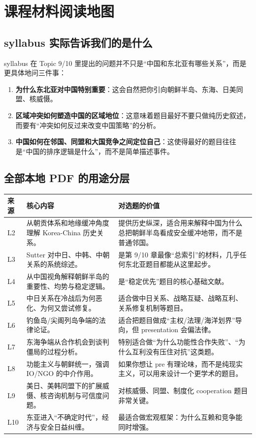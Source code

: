 \documentclass[a4paper]{article}
\begin{document}
\section{课程材料阅读地图}

\subsection{syllabus 实际告诉我们的是什么}

syllabus 在 Topic 9/10 里提出的问题并不只是``中国和东北亚有哪些关系''，而是更具体地问三件事：

\begin{enumerate}
\item \textbf{为什么东北亚对中国特别重要}：这会自然把你引向朝鲜半岛、东海、日美同盟、核威慑。
\item \textbf{区域冲突如何塑造中国的区域地位}：这意味着题目最好不要只做纯历史叙述，而要有``冲突如何反过来改变中国策略''的分析。
\item \textbf{中国如何在邻国、同盟和大国竞争之间定位自己}：这使得最好的题目往往是``中国的排序逻辑是什么''，而不是简单描述事件。
\end{enumerate}

\subsection{全部本地 PDF 的用途分层}

\begin{longtable}{p{2.0cm}p{4.6cm}p{7.0cm}}
\toprule
\textbf{来源} & \textbf{核心内容} & \textbf{对选题的价值} \\
\midrule
\endhead
L2 & 从朝贡体系和地缘缓冲角度理解 Korea-China 历史关系。 & 提供历史纵深，适合用来解释中国为什么总把朝鲜半岛看成安全缓冲地带，而不是普通邻国。 \\
L3 & Sutter 对中日、中韩、中朝关系的系统综述。 & 是第 9/10 章最像``总索引''的材料，几乎任何东北亚题目都能从这里起步。 \\
L4 & 从中国视角解释朝鲜半岛的重要性、均势与稳定逻辑。 & 是``稳定优先''题目的核心基础文献。 \\
L5 & 中日关系在冷战后为何恶化、为何又尝试修复。 & 适合做中日关系、战略互疑、战略互利、关系修复机制等题目。 \\
L6 & 钓鱼岛/尖阁列岛争端的法律论证。 & 适合把题目做成``主权/法理/海洋划界''导向，但 presentation 会偏法律。 \\
L7 & 东海争端从合作机会到谈判僵局的过程分析。 & 特别适合做``为什么功能性合作失败''、``为什么互利没有压住对抗''这类题。 \\
L8 & 功能主义与朝鲜统一，强调 IO/NGO 的中介作用。 & 如果你想让 pre 有理论味，而不是纯现实主义，可以用来设计一个更学术的题目。 \\
L9 & 美日、美韩同盟下的扩展威慑、核咨询机制与可信度问题。 & 对核威慑、同盟、制度化 cooperation 题目非常关键。 \\
L10 & 东亚进入``不确定时代''，经济与安全日益纠缠。 & 最适合做宏观框架：为什么互赖和竞争能同时增强。 \\
\bottomrule
\end{longtable}
\end{document}
